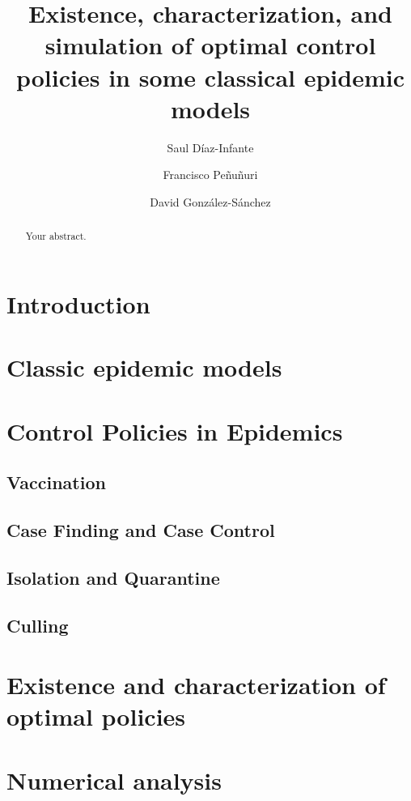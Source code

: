 \documentclass[titlepage]{amsart}
\title[%
	Existence, characterization and simulation of OCP for some epidemic 
	Models%
	]{
	Existence, characterization, and simulation
	of optimal control policies in some classical epidemic models
}
\author[S. D\'iaz-Infante]{Saul D\'iaz-Infante}
\author[F. Pe\~nu\~nuri]{Francisco Pe\~nu\~nuri}
\author[D. Gonz\'alez-S\'anchez]{David Gonz\'alez-S\'anchez}
\begin{document}
	\maketitle
  \begin{abstract}
  	Your abstract.
  \end{abstract}
%
%
  \section{Introduction}
    
  \section{Classic epidemic models}
    
  \section{Control Policies in Epidemics}
    
    \subsection{Vaccination}
      
    \subsection{Case Finding and Case Control}
      
    \subsection{Isolation and Quarantine}
      
    \subsection{Culling}
      
  \section{Existence and characterization of optimal policies}
    
%
%
  \section{Numerical analysis}
    
\end{document}
